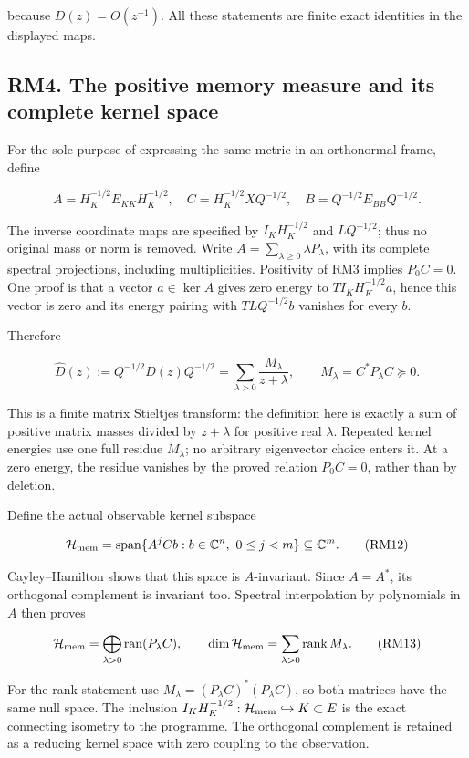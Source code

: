 \documentclass[11pt]{article}
\begin{document}
because \(D(z)=O(z^{-1})\). All these statements are finite exact identities in the displayed maps.

\subsection{RM4. The positive memory measure and its complete kernel space}\label{rm4.-the-positive-memory-measure-and-its-complete-kernel-space}

For the sole purpose of expressing the same metric in an orthonormal frame, define

\[
 A=H_K^{-1/2}E_{KK}H_K^{-1/2},\quad
 C=H_K^{-1/2}XQ^{-1/2},\quad B=Q^{-1/2}E_{BB}Q^{-1/2}.
 \tag{RM10}
\]

The inverse coordinate maps are specified by \(I_KH_K^{-1/2}\) and \(LQ^{-1/2}\); thus no original mass or norm is removed. Write \(A=\sum_{\lambda\ge0}\lambda P_\lambda\), with its complete spectral projections, including multiplicities. Positivity of RM3 implies \(P_0C=0\). One proof is that a vector \(a\in\ker A\) gives zero energy to \(TI_KH_K^{-1/2}a\), hence this vector is zero and its energy pairing with \(TLQ^{-1/2}b\) vanishes for every \(b\).

Therefore

\[
 \widehat D(z):=Q^{-1/2}D(z)Q^{-1/2}
 =\sum_{\lambda>0}\frac{M_\lambda}{z+\lambda},\qquad
 M_\lambda=C^*P_\lambda C\succeq0.
 \tag{RM11}
\]

This is a finite matrix Stieltjes transform: the definition here is exactly a sum of positive matrix masses divided by \(z+\lambda\) for positive real \(\lambda\). Repeated kernel energies use one full residue \(M_\lambda\); no arbitrary eigenvector choice enters it. At a zero energy, the residue vanishes by the proved relation \(P_0C=0\), rather than by deletion.

Define the actual observable kernel subspace

\[
 \mathcal H_{\rm mem}=\operatorname{span}\{A^jCb:b\in\mathbb C^n,\ 0\le j<m\}\subseteq\mathbb C^m.
 \tag{RM12}
\]

Cayley--Hamilton shows that this space is \(A\)-invariant. Since \(A=A^*\), its orthogonal complement is invariant too. Spectral interpolation by polynomials in \(A\) then proves

\[
 \mathcal H_{\rm mem}=\bigoplus_{\lambda>0}\operatorname{ran}(P_\lambda C),\qquad
 \dim\mathcal H_{\rm mem}=\sum_{\lambda>0}\operatorname{rank}M_\lambda.
 \tag{RM13}
\]

For the rank statement use \(M_\lambda=(P_\lambda C)^*(P_\lambda C)\), so both matrices have the same null space. The inclusion \(I_KH_K^{-1/2}:\mathcal H_{\rm mem}\hookrightarrow K\subset E\) is the exact connecting isometry to the programme. The orthogonal complement is retained as a reducing kernel space with zero coupling to the observation.
\end{document}
